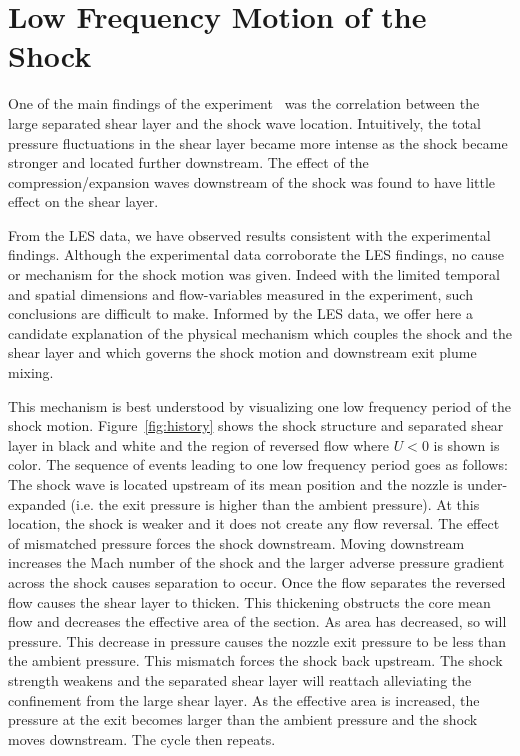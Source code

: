 \documentclass[]{aiaa-tc}%
\begin{document}
\section{Low Frequency Motion of the Shock}

One of the main findings of the experiment~\cite{Papam:10} was the correlation between the large separated shear layer and the shock wave location.  Intuitively, the total pressure fluctuations in the shear layer became more intense as the shock became stronger and located further downstream.   The effect of the compression/expansion waves downstream of the shock was found to have little effect on the shear layer.

From the LES data, we have observed results consistent with the experimental findings.  Although the experimental data corroborate the LES findings, no cause or mechanism for the shock motion was given.  Indeed with the limited temporal and spatial dimensions and flow-variables measured in the experiment, such conclusions are difficult to make.  Informed by the LES data, we offer here a candidate explanation of the physical mechanism which couples the shock and the shear layer and which governs the shock motion and downstream exit plume mixing.


This mechanism is best understood by visualizing one low frequency period of the shock motion.  Figure~\ref{fig:history} shows the shock structure and separated shear layer in black and white and the region of reversed flow where $U<0$ is shown is color.  The sequence of events leading to one low frequency period goes as follows:  The shock wave is located upstream of its mean position and the nozzle is under-expanded (i.e. the exit pressure is higher than the ambient pressure).  At this location, the shock is weaker and it does not create any flow reversal.  The effect of mismatched pressure forces the shock downstream.  Moving downstream increases the Mach number of the shock and the larger adverse pressure gradient across the shock causes separation to occur.  Once the flow separates the reversed flow causes the shear layer to thicken.  This thickening obstructs the core mean flow and decreases the effective area of the section.  As area has decreased, so will pressure.  This decrease in pressure causes the nozzle exit pressure to be less than the ambient pressure.  This mismatch forces the shock back upstream.  The shock strength weakens and the separated shear layer will reattach alleviating the confinement from the large shear layer.  As the effective area is increased, the pressure at the exit becomes larger than the ambient pressure and the shock moves downstream.  The cycle then repeats.
\end{document}
